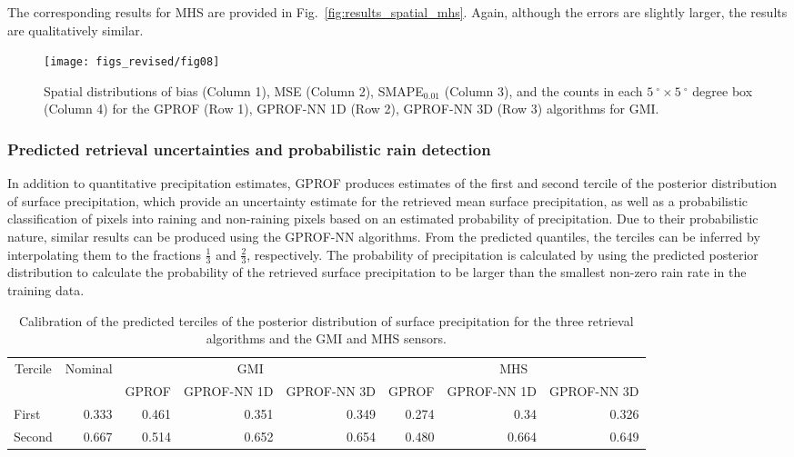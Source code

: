 \documentclass[journal abbreviation, manuscript]{copernicus}
\begin{document}
The corresponding results for MHS are provided in
Fig.~\ref{fig:results_spatial_mhs}. Again, although the errors are slightly
larger, the results are qualitatively similar.


\begin{figure}[hbpt]
  \centering
  \texttt{[image: figs\_revised/fig08]}
  \caption{
    Spatial distributions of bias (Column 1), MSE (Column 2), SMAPE$_{0.01}$
    (Column 3), and the counts in each $5\ \unit{^\circ} \times
    5\ \unit{^\circ}$ degree box (Column 4) for the GPROF (Row 1), GPROF-NN 1D
    (Row 2), GPROF-NN 3D (Row 3) algorithms for GMI.
  }
  \label{fig:results_spatial_gmi}
\end{figure}

\subsubsection{Predicted retrieval uncertainties and probabilistic rain detection}

In addition to quantitative precipitation estimates, GPROF produces estimates of
the first and second tercile of the posterior distribution of surface
precipitation, which provide an uncertainty estimate for the retrieved mean
surface precipitation, as well as a probabilistic classification of pixels into
raining and non-raining pixels based on an estimated probability of
precipitation. Due to their probabilistic nature, similar results can be
produced using the GPROF-NN algorithms. From the predicted quantiles, the terciles
can be inferred by interpolating them to the fractions $\frac{1}{3}$ and
$\frac{2}{3}$, respectively. The probability of precipitation is calculated by
using the predicted posterior distribution to calculate the probability of the
retrieved surface precipitation to be larger than the smallest non-zero rain
rate in the training data.

\begin{table}
  \caption{
    Calibration of the predicted terciles of the posterior distribution of
    surface precipitation  for the three retrieval algorithms and the GMI
    and MHS sensors.
  }
  \label{tab:terciles}
    \centering
  \begin{tabular}{|l|r|rrr|rrr|}
    \hline
    \multicolumn{1}{|c|}{\multirow{2}{*}{Tercile}} &
    \multicolumn{1}{c|}{\multirow{2}{*}{Nominal}} &
    \multicolumn{3}{c|}{GMI} &
    \multicolumn{3}{c|}{MHS} \\
    & & GPROF & GPROF-NN 1D & GPROF-NN 3D & GPROF & GPROF-NN 1D & GPROF-NN 3D \\
    \hline
    First & 0.333 & 0.461 & 0.351 & 0.349  & 0.274 & 0.34 & 0.326 \\
    Second & 0.667 & 0.514 & 0.652 & 0.654  & 0.480 & 0.664 & 0.649 \\
    \hline
  \end{tabular}

\end{table}
\end{document}
